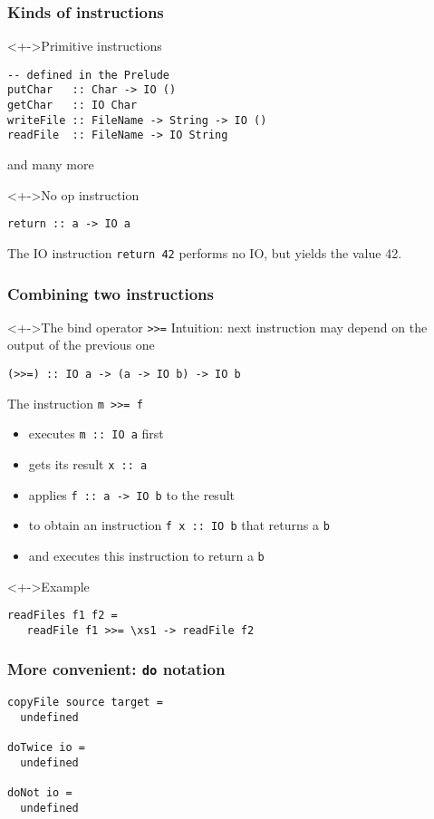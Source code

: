 \documentclass{beamer}
\begin{document}
\begin{frame}[fragile]
  \frametitle{Kinds of instructions}
  \begin{block}<+->{Primitive instructions}
\begin{verbatim}
-- defined in the Prelude
putChar   :: Char -> IO ()
getChar   :: IO Char
writeFile :: FileName -> String -> IO ()
readFile  :: FileName -> IO String
\end{verbatim}
and many more
  \end{block}
  \begin{block}<+->{No op instruction}
\begin{verbatim}
return :: a -> IO a
\end{verbatim}
    The IO instruction \texttt{return 42} performs no IO, but yields the value 42.
  \end{block}
\end{frame}
\begin{frame}[fragile]
  \frametitle{Combining two instructions}
  \begin{block}<+->{The bind operator \texttt{>>=}}
    Intuition:  next instruction may depend on the output of the previous one
\begin{verbatim}
(>>=) :: IO a -> (a -> IO b) -> IO b
\end{verbatim}
    The instruction \texttt{m >>= f}
    \begin{itemize}
    \item executes \texttt{m :: IO a} first
    \item gets its result \texttt{x :: a}
    \item applies \texttt{f :: a -> IO b} to the result
    \item to obtain an instruction \texttt{f x :: IO b} that returns a \texttt{b}
    \item and executes this instruction to return a \texttt{b}
    \end{itemize}
  \end{block}
  \begin{block}<+->{Example}
\begin{verbatim}
readFiles f1 f2 =
   readFile f1 >>= \xs1 -> readFile f2 
\end{verbatim}
  \end{block}
\end{frame}
\begin{frame}[fragile]
  \frametitle{More convenient: \texttt{do} notation}
\begin{verbatim}
copyFile source target =
  undefined

doTwice io =
  undefined

doNot io =
  undefined
\end{verbatim}
\end{frame}
\end{document}
